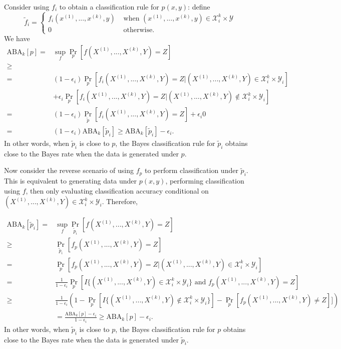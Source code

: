 Consider using $f_i$ to obtain a classification rule for $p(x, y)$:
define
\[
\tilde{f}_i = \begin{cases}f_i(x^{(1)},...,x^{(k)}, y) & \text{ when } (x^{(1)},...,x^{(k)}, y) \in \mathcal{X}_i^k \times \mathcal{Y}\\
0 & \text{ otherwise.} 
\end{cases}
\]
We have
\begin{align*}
\text{ABA}_k[p] =& \sup_f \Pr_p[f(X^{(1)},...,X^{(k)}, Y) = Z]
\\ \geq& 
\\=& (1-\epsilon_i)\Pr_p[f_i(X^{(1)},...,X^{(k)}, Y) = Z|(X^{(1)},...,X^{(k)}, Y)\in \mathcal{X}_i^k \times \mathcal{Y}_i]
\\&+ \epsilon_i \Pr_p[f_i(X^{(1)},...,X^{(k)}, Y) = Z|(X^{(1)},...,X^{(k)}, Y)\notin \mathcal{X}_i^k \times \mathcal{Y}_i]
\\=& (1-\epsilon_i)\Pr_{\tilde{p}}[f_i(X^{(1)},...,X^{(k)}, Y) = Z]
+ \epsilon_i 0
\\=& (1-\epsilon_i) \text{ABA}_k[\tilde{p}_i] \geq \text{ABA}_k[\tilde{p}_i] - \epsilon_i.
\end{align*}
In other words, when $\tilde{p}_i$ is close to $p$, the Bayes
classification rule for $\tilde{p}_i$ obtains close to the Bayes rate
when the data is generated under $p$.

Now consider the reverse scenario of using $f_p$ to perform
classification under $\tilde{p}_i$.  This is equivalent to generating
data under $p(x, y)$, performing classification using $f$, then only
evaluating classification accuracy conditional on $(X^{(1)},...,X^{(k)},
Y)\in \mathcal{X}_i^k \times \mathcal{Y}_i$.  Therefore,

\begin{align*}
\text{ABA}_k[\tilde{p}_i] =& \sup_f \Pr_{\tilde{p}_i}[f(X^{(1)},...,X^{(k)}, Y) = Z]
\\\geq &  \Pr_{\tilde{p}_i}[f_p(X^{(1)},...,X^{(k)}, Y) = Z]
\\=& \Pr_p[f_p(X^{(1)},...,X^{(k)}, Y) = Z| (X^{(1)},...,X^{(k)}, Y)\in \mathcal{X}_i^k \times \mathcal{Y}_i]
\\=& \frac{1}{1-\epsilon_i} \Pr_p[I\{(X^{(1)},...,X^{(k)}, Y)\in \mathcal{X}_i^k \times \mathcal{Y}_i\} \text{ and }f_p(X^{(1)},...,X^{(k)}, Y) = Z]
\\\geq & \frac{1}{1-\epsilon_i} \left(1 - \Pr_p[I\{(X^{(1)},...,X^{(k)}, Y)\notin \mathcal{X}_i^k \times \mathcal{Y}_i\}] - \Pr_p[f_p(X^{(1)},...,X^{(k)}, Y) \neq Z]]\right)
\\&= \frac{\text{ABA}_k[p] - \epsilon_i}{1-\epsilon_i} \geq \text{ABA}_k[p] - \epsilon_i.
\end{align*}
In other words, when $\tilde{p}_i$ is close to $p$, the Bayes
classification rule for $p$ obtains close to the Bayes rate when the
data is generated under $\tilde{p}_i$.

